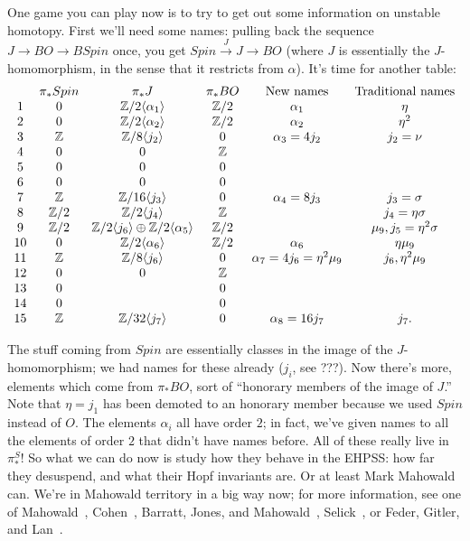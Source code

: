 \documentclass{article}
\newcommand{\Z}{\mathbb{Z}}
\begin{document}
One game you can play now is to try to get out some information on unstable homotopy.  First we'll need some names: pulling back the sequence $J \to BO \to BSpin$ once, you get $Spin \stackrel{J}{\to} J \to BO$ (where $J$ is essentially the $J$-homomorphism, in the sense that it restricts from $\alpha$).  It's time for another table:
\[
\begin{array}{cccccc}
& \pi_* Spin & \pi_* J & \pi_* BO & \hbox{New names} & \hbox{Traditional names} \\
1 & 0 & \Z/2 \langle \alpha_1 \rangle & \Z/2 & \alpha_1 & \eta \\
2 & 0 & \Z/2 \langle \alpha_2 \rangle & \Z/2 & \alpha_2 & \eta^2 \\
3 & \Z & \Z/8 \langle j_2  \rangle & 0 & \alpha_3 = 4 j_2 & j_2 = \nu \\
4 & 0 & 0 & \Z \\
5 & 0 & 0 & 0 \\
6 & 0 & 0 & 0 \\
7 & \Z & \Z/16 \langle j_3 \rangle & 0 & \alpha_4 = 8j_3 & j_3 = \sigma \\
8 & \Z/2 & \Z/2 \langle j_4 \rangle & \Z & & j_4 = \eta \sigma \\
9 & \Z/2 & \Z/2 \langle j_6 \rangle \oplus \Z/2 \langle \alpha_5 \rangle & \Z/2 & & \mu_9, j_5 = \eta^2 \sigma \\
10 & 0 & \Z/2 \langle \alpha_6 \rangle & \Z/2 & \alpha_6 & \eta \mu_9 \\
11 & \Z & \Z/8 \langle j_6 \rangle & 0 & \alpha_7 = 4 j_6 = \eta^2 \mu_9 & j_6, \eta^2 \mu_9 \\
12 & 0 & 0 & \Z \\
13 & 0 & & 0 \\
14 & 0 & & 0 \\
15 & \Z & \Z/32 \langle j_7 \rangle & 0 & \alpha_8 = 16j_7 & j_7.
\end{array}
\]

The stuff coming from $Spin$ are essentially classes in the image of the $J$-homomorphism; we had names for these already ($j_i$, see ???).  Now there's more, elements which come from $\pi_* BO$, sort of ``honorary members of the image of $J$.''  Note that $\eta = j_1$ has been demoted to an honorary member because we used $Spin$ instead of $O$.  The elements $\alpha_i$ all have order $2$; in fact, we've given names to all the elements of order $2$ that didn't have names before.  All of these really live in $\pi_*^S$!  So what we can do now is study how they behave in the EHPSS: how far they desuspend, and what their Hopf invariants are.  Or at least Mark Mahowald can.  We're in Mahowald territory in a big way now; for more information, see one of Mahowald~\cite{Mahowald}, Cohen~\cite{CohenKervaire}, Barratt, Jones, and Mahowald~\cite{BJM}, Selick~\cite{Selick}, or Feder, Gitler, and Lan~\cite{FGL}.
\end{document}
